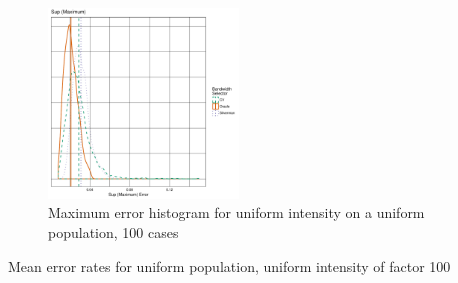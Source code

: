 \begin{figure}[htbp]
    \centering
    \includegraphics[width=0.45\textwidth]{output/maxerr-histogram}
    \caption[Maximum error: uniform on uniform]{Maximum error histogram for uniform intensity on a uniform population, 100 cases}
    \label{fig:maxerr:template}
\end{figure}

\begin{table}[htbp]
\centering

\caption{Mean error rates for uniform population, uniform intensity of factor 100}
\label{tab:errors:template}
\end{table}

